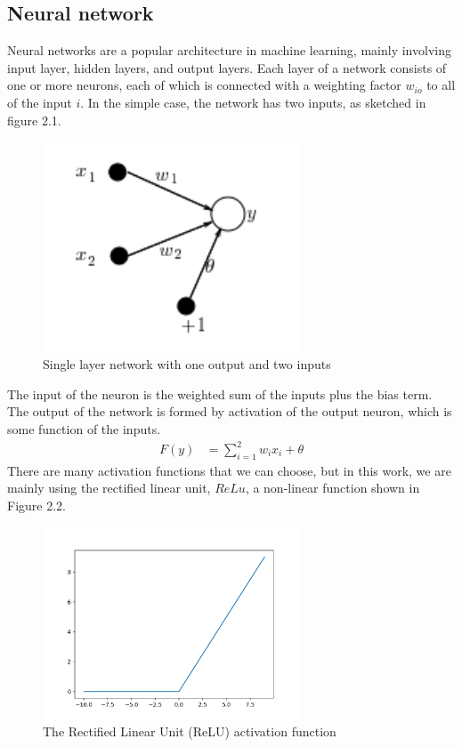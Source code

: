 \subsection{Neural network}
Neural networks are a popular architecture in machine learning, mainly involving input layer, hidden layers, and output layers. Each layer of a network consists of one or more neurons, each of which is connected with a weighting factor $w_{io}$ to all of the input $i$. In the simple case, the network has two inputs, as sketched in figure 2.1. 
\begin{figure}
  \centering
    \includegraphics[width=3.0in]{figs/nn_2.1}
    \caption{Single layer network with one output and two inputs\cite{krose1993introduction}}
\end{figure}
The input of the neuron is the weighted sum of the inputs plus the bias term. The output of the network is formed by activation of the output neuron, which is some function of the inputs. 
\begin{align*}
F(y) &=  \sum_{i=1}^{2}w_ix_i+\theta
\end{align*}
There are many activation functions that we can choose, but in this work, we are mainly using the rectified linear unit, $ReLu$, a non-linear function shown in Figure 2.2.
\begin{figure}
\centering
\includegraphics[width=3.0in]{figs/relu}
\caption{The Rectified Linear Unit (ReLU) activation function\cite{nair2010proceedings}}
\end{figure}
